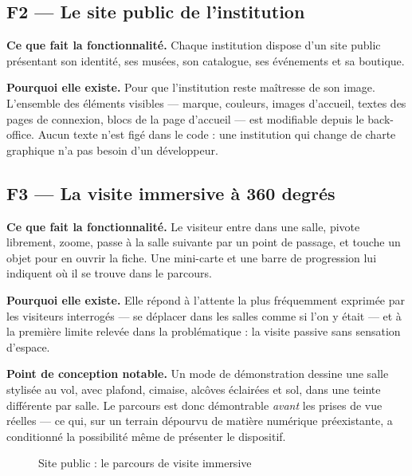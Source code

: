 \subsection{F2 — Le site public de l'institution}

\textbf{Ce que fait la fonctionnalité.} Chaque institution dispose d'un site
public présentant son identité, ses musées, son catalogue, ses événements et sa
boutique.

\textbf{Pourquoi elle existe.} Pour que l'institution reste maîtresse de son
image. L'ensemble des éléments visibles — marque, couleurs, images d'accueil,
textes des pages de connexion, blocs de la page d'accueil — est modifiable
depuis le back-office. Aucun texte n'est figé dans le code : une institution qui
change de charte graphique n'a pas besoin d'un développeur.

\subsection{F3 — La visite immersive à 360 degrés}

\textbf{Ce que fait la fonctionnalité.} Le visiteur entre dans une salle,
pivote librement, zoome, passe à la salle suivante par un point de passage, et
touche un objet pour en ouvrir la fiche. Une mini-carte et une barre de
progression lui indiquent où il se trouve dans le parcours.

\textbf{Pourquoi elle existe.} Elle répond à l'attente la plus fréquemment
exprimée par les visiteurs interrogés — se déplacer dans les salles comme si
l'on y était — et à la première limite relevée dans la problématique : la visite
passive sans sensation d'espace.

\textbf{Point de conception notable.} Un mode de démonstration dessine une salle
stylisée au vol, avec plafond, cimaise, alcôves éclairées et sol, dans une
teinte différente par salle. Le parcours est donc démontrable \emph{avant} les
prises de vue réelles — ce qui, sur un terrain dépourvu de matière numérique
préexistante, a conditionné la possibilité même de présenter le dispositif.

\begin{figure}[htbp]
\centering
{}
\caption{Site public : le parcours de visite immersive}
\label{fig:cap-tour}
\end{figure}

